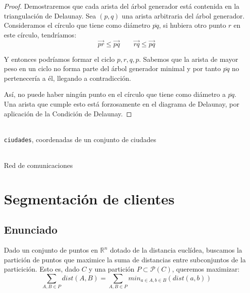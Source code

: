 \documentclass[a4paper, 11pt]{article} %
\begin{document}
    \begin{proof}
      Demostraremos que cada arista del árbol generador está contenida en la triangulación de Delaunay.
      Sea $(p,q)$ una arista arbitraria del árbol generador. 
      Consideramos el círculo que tiene como diámetro $\overline{pq}$, si hubiera otro punto $r$ en este círculo, tendríamos:
      \begin{equation}
       \overrightarrow{pr} \leq \overrightarrow{pq} \qquad \overrightarrow{rq} \leq \overrightarrow{pq}
      \end{equation}

      Y entonces podríamos formar el ciclo $p,r,q,p$. Sabemos que la arista de mayor peso en un ciclo no forma parte del árbol generador minimal y por tanto $\overline{pq}$
      no pertenecería a él, llegando a contradicción.

      Así, no puede haber ningún punto en el círculo que tiene como diámetro a $\overline{pq}$. Una arista que cumple esto está forzosamente en el diagrama de Delaunay,
      por aplicación de la Condición de Delaunay.
    \end{proof}
    
    
    \begin{algorithm}[H]
	\begin{algorithmic}[1]
		\REQUIRE \ \\
        	\texttt{ciudades}, coordenadas de un conjunto de ciudades \\\
		\RETURN{$Kruskal(\texttt{grafo})$}
	\end{algorithmic}
      \caption{Red de comunicaciones}
      \label{red}
    \end{algorithm}
    
\section{Segmentación de clientes}
  \subsection{Enunciado}
    Dado un conjunto de puntos en $\mathbb{R}^n$ dotado de la distancia euclídea, buscamos la partición de puntos que
    maximice la suma de distancias entre subconjuntos de la particición. Esto es, dado $C$ y una partición $P \subset \mathcal{P}(C)$,
    queremos maximizar:
    \begin{equation}
     \sum_{A,B \in P} dist(A,B) = \sum_{A,B \in P} min_{a\in A, b\in B}(dist(a,b))
    \end{equation}
\end{document}
